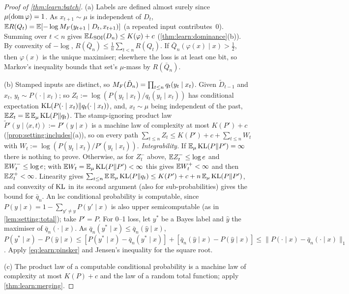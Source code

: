 \begin{proof}[Proof of \cref{thm:learn:batch}]
(a) Labels are defined almost surely since $\mu(\operatorname{dom}\varphi)=1$. As $x_{t+1}\sim\mu$ is independent of $D_t$, $\mathbb{E} R(Q_t)=\mathbb{E}[-\log M_{F}(y_{t+1}\mid D_t,x_{t+1})]$ (a repeated input contributes~$0$). Summing over $t<n$ gives $\mathbb{E}L_{\mathrm{SOI}}(D_n)\le K(\varphi)+c$ (\cref{thm:learn:dominance}(b)). By convexity of $-\log$, $R(\bar Q_n)\le\frac1n\sum_{t<n}R(Q_t)$. If $\bar Q_n(\varphi(x)\mid x)>\frac12$, then $\varphi(x)$ is the unique maximiser; elsewhere the loss is at least one bit, so Markov's inequality bounds that set's $\mu$-mass by $R(\bar Q_n)$.

(b) Stamped inputs are distinct, so $M_{F}(\tilde D_n)=\prod_{t\le n}q_t(y_t\mid x_t)$. Given $\tilde D_{t-1}$ and $x_t$, $y_t\sim P(\cdot\mid x_t)$; so $Z_t:=\log(P(y_t\mid x_t)/q_t(y_t\mid x_t))$ has conditional expectation $\operatorname{KL}(P(\cdot\mid x_t)\|q_t(\cdot\mid x_t))$, and, $x_t\sim\mu$ being independent of the past, $\mathbb{E} Z_t=\mathbb{E}\,\mathbb{E}_\mu\operatorname{KL}(P\|q_t)$. The stamp-ignoring product law $\tilde P'(y\mid\langle x,t\rangle):=P'(y\mid x)$ is a machine law of complexity at most $K(P')+c$ (\cref{prop:setting:includes}(a)), so on every path $\sum_{t\le n}Z_t\le K(P')+c+\sum_{t\le n}W_t$ with $W_t:=\log(P(y_t\mid x_t)/P'(y_t\mid x_t))$.
\emph{Integrability.} If $\mathbb{E}_\mu\operatorname{KL}(P\|P')=\infty$ there is nothing to prove. Otherwise, as for $Z_t^-$ above, $\mathbb{E} Z_t^-\le\log e$ and $\mathbb{E} W_t^-\le\log e$; with $\mathbb{E} W_t=\mathbb{E}_\mu\operatorname{KL}(P\|P')<\infty$ this gives $\mathbb{E} W_t^+<\infty$ and then $\mathbb{E} Z_t^+<\infty$. Linearity gives $\sum_{t\le n}\mathbb{E}\,\mathbb{E}_\mu\operatorname{KL}(P\|q_t)\le K(P')+c+n\,\mathbb{E}_\mu\operatorname{KL}(P\|P')$, and convexity of $\operatorname{KL}$ in its second argument (also for sub-probabilities) gives the bound for $\bar q_n$. An lsc conditional probability is computable, since $P(y\mid x)=1-\sum_{y'\ne y}P(y'\mid x)$ is also upper semicomputable (as in \cref{lem:setting:total}); take $P'=P$.
For 0--1 loss, let $y^*$ be a Bayes label and $\hat y$ the maximiser of $\bar q_n(\cdot\mid x)$. As $\bar q_n(y^*\mid x)\le\bar q_n(\hat y\mid x)$, $P(y^*\mid x)-P(\hat y\mid x)\le[P(y^*\mid x)-\bar q_n(y^*\mid x)]+[\bar q_n(\hat y\mid x)-P(\hat y\mid x)]\le\|P(\cdot\mid x)-\bar q_n(\cdot\mid x)\|_1$. Apply \eqref{eq:learn:pinsker} and Jensen's inequality for the square root.

(c) The product law of a computable conditional probability is a machine law of complexity at most $K(P)+c$ and the law of a random total function; apply \cref{thm:learn:merging}.
\end{proof}

